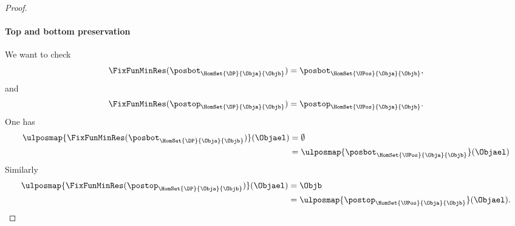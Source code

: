 \begin{proof}
    \paragraph*{Top and bottom preservation}
    We want to check
    \begin{equation*}
        \FixFunMinRes(\posbot_{\HomSet{\DP}{\Obja}{\Objb}})=\posbot_{\HomSet{\UPos}{\Obja}{\Objb}},
    \end{equation*}
    and
    \begin{equation*}
        \FixFunMinRes(\postop_{\HomSet{\DP}{\Obja}{\Objb}})=\postop_{\HomSet{\UPos}{\Obja}{\Objb}}.
    \end{equation*}
    One has
    \begin{equation*}
        \begin{aligned}
            \ulposmap{\FixFunMinRes(\posbot_{\HomSet{\DP}{\Obja}{\Objb}})}(\Objael)&=\emptyset\\
            &=\ulposmap{\posbot_{\HomSet{\UPos}{\Obja}{\Objb}}}(\Objael)
        \end{aligned}
    \end{equation*}
    Similarly
    \begin{equation*}
        \begin{aligned}
            \ulposmap{\FixFunMinRes(\postop_{\HomSet{\DP}{\Obja}{\Objb}})}(\Objael)&=\Objb\\
            &=\ulposmap{\postop_{\HomSet{\UPos}{\Obja}{\Objb}}}(\Objael).
        \end{aligned}
    \end{equation*}
\end{proof}

